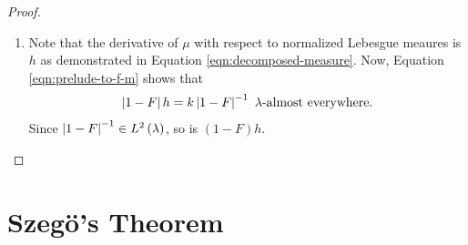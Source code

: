 \begin{proof}
\begin{enumerate}
\item Note that the derivative of $\mu$ with respect to normalized Lebesgue meaures is $h$ as demonstrated in Equation \ref{eqn:decomposed-measure}. Now, Equation \ref{eqn:prelude-to-f-m} shows that 
    \begin{align*}
	\left\lvert 1-F \right\rvert h = k\left\lvert 1-F \right\rvert^{-1} \text{ $\lambda$-almost everywhere.}
    \end{align*}
    Since $\left\lvert  1-F \right\rvert^{-1} \in L^{2} \left( \lambda \right)$, so is $(1-F)h$.
    \end{enumerate}
\end{proof}

\section{Szegö's Theorem}
